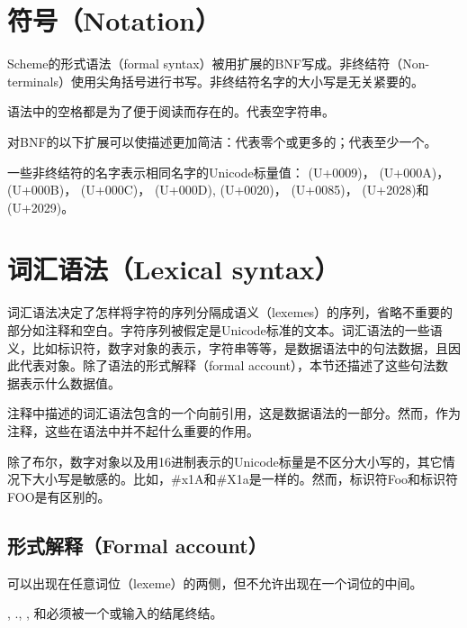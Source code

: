 \section{符号（Notation）}
\label{BNF}

Scheme的形式语法（formal syntax）被用扩展的BNF写成。非终结符（Non-terminals）使用尖角括号进行书写。非终结符名字的大小写是无关紧要的。

语法中的空格都是为了便于阅读而存在的。代表空字符串。

对BNF的以下扩展可以使描述更加简洁：代表零个或更多的；代表至少一个。

一些非终结符的名字表示相同名字的Unicode标量值： (U+0009)， (U+000A)， (U+000B)， (U+000C)， (U+000D),
 (U+0020)， (U+0085)， (U+2028)和 (U+2029)。

\section{词汇语法（Lexical syntax）}
\label{lexicalsyntaxsection}

词汇语法决定了怎样将字符的序列分隔成语义（lexemes）的序列，省略不重要的部分如注释和空白。字符序列被假定是Unicode标准\cite{Unicode}的文本。词汇语法的一些语义，比如标识符，数字对象的表示，字符串等等，是数据语法中的句法数据，且因此代表对象。除了语法的形式解释（formal account），本节还描述了这些句法数据表示什么数据值。

注释中描述的词汇语法包含的一个向前引用，这是数据语法的一部分。然而，作为注释，这些在语法中并不起什么重要的作用。

除了布尔，数字对象以及用16进制表示的Unicode标量是不区分大小写的，其它情况下大小写是敏感的。比如，{\cf \#x1A}和{\cf \#X1a}是一样的。然而，标识符{\cf Foo}和标识符{\cf FOO}是有区别的。

\subsection{形式解释（Formal account）}
\label{lexicalgrammarsection}

可以出现在任意词位（lexeme）的两侧，但不允许出现在一个词位的中间。

, {\cf .}, , 和必须被一个或输入的结尾终结。

